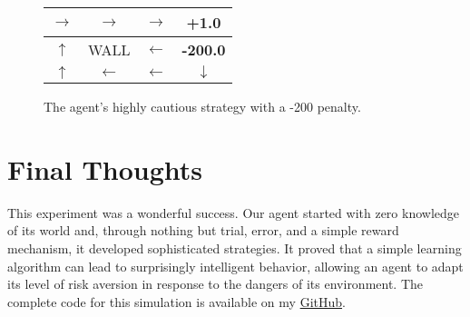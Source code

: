 \documentclass[11pt, a4paper]{article}
\begin{document}
\begin{figure}[h!]
    \centering
    \begin{tabular}{|c|c|c|c|}
        \hline
        $\rightarrow$ & $\rightarrow$ & $\rightarrow$ & \textbf{+1.0} \\
        \hline
        $\uparrow$ & WALL & $\leftarrow$ & \textbf{-200.0} \\
        \hline
        $\uparrow$ & $\leftarrow$ & $\leftarrow$ & $\downarrow$ \\
        \hline
    \end{tabular}
    \caption{The agent's highly cautious strategy with a -200 penalty.}
    \label{fig:policy2}
\end{figure}

\section{Final Thoughts}
This experiment was a wonderful success. Our agent started with zero knowledge of its world and, through nothing but trial, error, and a simple reward mechanism, it developed sophisticated strategies. It proved that a simple learning algorithm can lead to surprisingly intelligent behavior, allowing an agent to adapt its level of risk aversion in response to the dangers of its environment. The complete code for this simulation is available on my \href{https://github.com/Jeevan-HM/RL-in-Robotics.git}{GitHub}.
\end{document}
